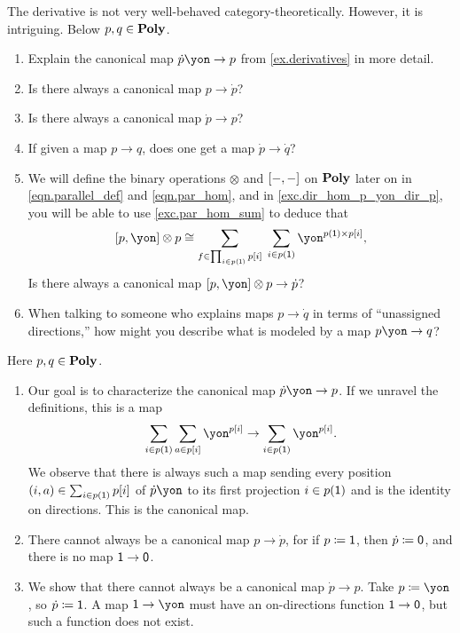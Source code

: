 \documentclass[Book-Poly]{subfiles}
\begin{document}
\begin{exercise}
The derivative is not very well-behaved category-theoretically.
However, it is intriguing.
Below $p, q \in \mathbf{Poly}$.
\begin{enumerate}
	\item Explain the canonical map $\dot{p}\yon\to p$ from \cref{ex.derivatives} in more detail.
	\item Is there always a canonical map $p\to \dot{p}$?
	\item Is there always a canonical map $\dot{p}\to p$?
	\item If given a map $p\to q$, does one get a map $\dot{p}\to\dot{q}$?
	\item We will define the binary operations $\otimes$ and $[-,-]$ on $\mathbf{Poly}$ later on in \eqref{eqn.parallel_def} and \eqref{eqn.par_hom}, and in \cref{exc.dir_hom_p_yon_dir_p}, you will be able to use \cref{exc.par_hom_sum} to deduce that
	\begin{equation} \label{eqn.dir_hom_p_yon_dir_p}
	    \ihom{p, \yon} \otimes p \iso \sum_{f \in \prod_{i \in p(\1)} p[i]} \; \sum_{i \in p(\1)} \yon^{p(\1) \times p[i]},
	\end{equation}
	Is there always a canonical map $\ihom{p,\yon}\otimes p\to \dot{p}$?
	\item When talking to someone who explains maps $p\to\dot{q}$ in terms of ``unassigned directions,'' how might you describe what is modeled by a map $p\yon\to q$?
	\qedhere
\end{enumerate}
\begin{solution}
Here $p, q \in \mathbf{Poly}$.
\begin{enumerate}
	\item Our goal is to characterize the canonical map $\dot{p}\yon\to p$.
	If we unravel the definitions, this is a map
	\[
	    \sum_{i \in p(\1)} \sum_{a \in p[i]} \yon^{p[i]} \to \sum_{i \in p(\1)} \yon^{p[i]}.
	\]
	We observe that there is always such a map sending every position $(i, a) \in \sum_{i \in p(\textsf{1})} p[i]$ of $\dot{p}\yon$ to its first projection $i \in p(\textsf{1})$ and is the identity on directions.
	This is the canonical map.

	\item There cannot always be a canonical map $p\to \dot{p}$, for if $p \coloneqq \textsf{1}$, then $\dot{p} \coloneqq \textsf{0}$, and there is no map $\textsf{1} \to \textsf{0}$.
	
	\item We show that there cannot always be a canonical map $\dot{p}\to p$.
	Take $p \coloneqq \yon$, so $\dot{p} \coloneqq \textsf{1}$.
	A map $\1 \to \yon$ must have an on-directions function $\textsf{1} \to \textsf{0}$, but such a function does not exist.
	

\end{enumerate}
\end{solution}
\end{exercise}
\end{document}
